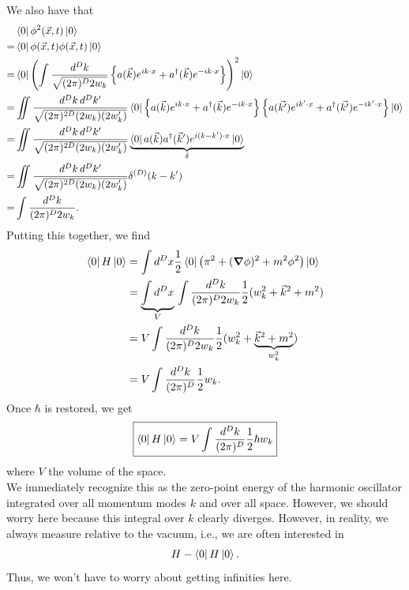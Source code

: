 \documentclass{book}
\theoremstyle{definition}
\newcommand{\f}[2]{\frac{#1}{#2}}
\newcommand{\lp}{\left(}
\newcommand{\rp}{\right)}
\newcommand{\lc}{\left\{}
\newcommand{\rc}{\right\}}
\begin{document}
We also have that
\begin{align}
&\bra{0}\phi^2(\vec{x},t)\ket{0} \nonumber\\
= &\bra{0}\phi(\vec{x},t)\phi(\vec{x},t)\ket{0} \nonumber\\
= &\bra{0} \lp \int \f{d^Dk}{\sqrt{(2\pi)^D 2w_k}} \lc a(\vec{k})e^{ik\cdot x} + a^\dagger(\vec{k})e^{-ik\cdot x} \rc \rp^2   \ket{0} \nonumber\\
= &\iint \f{d^D k\,d^Dk'}{\sqrt{(2\pi)^{2D}(2w_k)(2w_k')}}\bra{0} \lc a(\vec{k})e^{ik\cdot x} + a^\dagger(\vec{k})e^{-ik\cdot x}  \rc \lc a(\vec{k'})e^{ik'\cdot x} + a^\dagger(\vec{k'})e^{-ik'\cdot x}  \rc \ket{0} \nonumber\\
= &\iint \f{d^D k\,d^Dk'}{\sqrt{(2\pi)^{2D}(2w_k)(2w_k')}}\underbrace{\bra{0} a(\vec{k})a^\dagger(\vec{k}')e^{i(k-k')\cdot x} \ket{0}}_\delta \nonumber\\
= &\iint \f{d^D k\,d^Dk'}{\sqrt{(2\pi)^{2D}(2w_k)(2w_k')}} \delta^{(D)}(k - k')\nonumber\\
= & \int \f{d^D k}{(2\pi)^D 2w_k}.
\end{align}
Putting this together, we find
\begin{align}
\bra{0}H\ket{0} &= \int d^Dx\f{1}{2}\bra{0} \lp \pi^2 + (\grad{\phi})^2 + m^2 \phi^2 \rp\ket{0} \nonumber\\
&= \underbrace{\int d^Dx}_{V}\,  \int \f{d^D k}{(2\pi)^D 2w_k} \f{1}{2} (w_k^2 + \vec{k}^2 + m^2)   \nonumber\\
&= V  \int \f{d^D k}{(2\pi)^D 2w_k} \f{1}{2} (w_k^2 + \underbrace{\vec{k}^2 + m^2}_{w_k^2}) \nonumber\\
&= V  \int \f{d^D k}{(2\pi)^D} \f{1}{2}w_k.
\end{align}
Once $\hbar$ is restored, we get
\begin{align}
\boxed{\bra{0}H\ket{0} = V  \int \f{d^D k}{(2\pi)^D} \f{1}{2}\hbar w_k}
\end{align}
where $V$ the volume of the space. \\


We immediately recognize this as the zero-point energy of the harmonic oscillator integrated over all momentum modes $k$ and over all space. However, we should worry here because this integral over $k$ clearly diverges. However, in reality, we always measure relative to the vacuum, i.e., we are often interested in 
\begin{align}
H - \bra{0}H\ket{0}.
\end{align}
Thus, we won't have to worry about getting infinities here.
\end{document}
